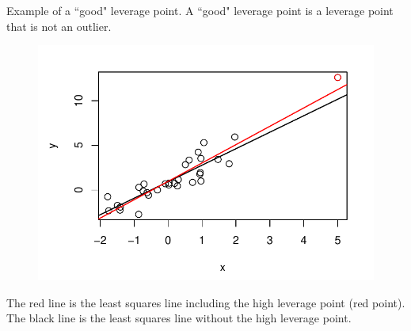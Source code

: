 \documentclass[10pt]{beamer}
\begin{document}
\begin{frame}
Example of a ``good" leverage point.  A ``good" leverage point is a leverage point that is not an outlier.  

\begin{center}
\begin{figure}
\includegraphics[scale=0.6]{figure/good_leverage.pdf}
\end{figure}
\end{center}

The red line is the least squares line including the high leverage point (red point).  The black line is the least squares line without the high leverage point.  
\end{frame}
\end{document}
